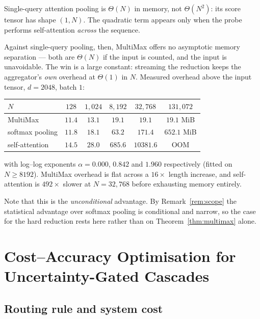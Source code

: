 \begin{remark}
\label{rem:complexity-scope}
Single-query attention pooling is $\Theta(N)$ in memory, not $\Theta(N^2)$: its score
tensor has shape $(1,N)$. The quadratic term appears only when the probe performs
self-attention \emph{across} the sequence.

Against single-query pooling, then, MultiMax offers no asymptotic memory separation ---
both are $\Theta(N)$ if the input is counted, and the input is unavoidable. The win is a
large constant: streaming the reduction keeps the aggregator's \emph{own} overhead at
$\Theta(1)$ in $N$. Measured overhead above the input tensor, $d=2048$, batch $1$:
%
\begin{center}
\begin{tabular}{lccccc}
\hline
$N$ & $128$ & $1{,}024$ & $8{,}192$ & $32{,}768$ & $131{,}072$\\
\hline
MultiMax        & $11.4$ & $13.1$ & $19.1$ & $19.1$ & $\mathbf{19.1}$ MiB\\
softmax pooling & $11.8$ & $18.1$ & $63.2$ & $171.4$ & $\mathbf{652.1}$ MiB\\
self-attention  & $14.5$ & $28.0$ & $685.6$ & $10381.6$ & OOM\\
\hline
\end{tabular}
\end{center}
%
with log--log exponents $\alpha=0.000$, $0.842$ and $1.960$ respectively (fitted on
$N\ge 8192$). MultiMax overhead is flat across a $16\times$ length increase, and
self-attention is $492\times$ slower at $N=32{,}768$ before exhausting memory entirely.

Note that this is the \emph{unconditional} advantage. By Remark~\ref{rem:scope} the
statistical advantage over softmax pooling is conditional and narrow, so the case for
the hard reduction rests here rather than on Theorem~\ref{thm:multimax} alone.
\end{remark}


\section{Cost--Accuracy Optimisation for Uncertainty-Gated Cascades}
\label{sec:cascade}

\subsection{Routing rule and system cost}


